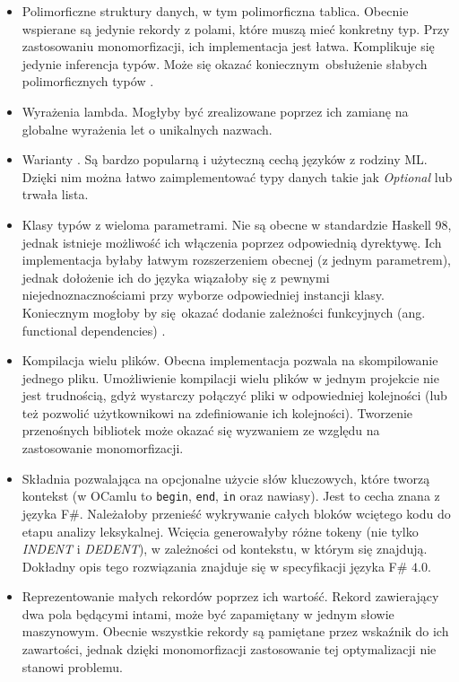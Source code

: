 \documentclass[declaration,shortabstract]{iithesis}
\begin{document}
\begin{itemize}
  \item Polimorficzne struktury danych, w tym polimorficzna tablica. Obecnie 
  wspierane są jedynie rekordy z polami, które muszą mieć konkretny typ. 
  Przy zastosowaniu monomorfizacji, ich implementacja jest łatwa. Komplikuje
  się jedynie inferencja typów. Może się okazać koniecznym obsłużenie słabych 
  polimorficznych typów \cite{weak_poly_ocaml}.
  \item Wyrażenia lambda. Mogłyby być zrealizowane poprzez ich zamianę na 
  globalne wyrażenia let o unikalnych nazwach. 
  \item Warianty \cite[Chapter 6]{real_ocaml}. Są bardzo popularną i użyteczną cechą 
  języków z rodziny ML. Dzięki nim można łatwo zaimplementować typy danych takie 
  jak \textit{Optional} lub trwała lista.   
  \item Klasy typów z wieloma parametrami. Nie są obecne w standardzie 
  Haskell 98, jednak istnieje możliwość ich włączenia poprzez odpowiednią 
  dyrektywę. Ich implementacja byłaby łatwym 
  rozszerzeniem obecnej (z jednym parametrem), jednak dołożenie ich do języka 
  wiązałoby się z pewnymi niejednoznacznościami \cite{multi_params_tcs}
  przy wyborze odpowiedniej instancji klasy. Koniecznym mogłoby by się okazać 
  dodanie zależności funkcyjnych (ang. functional dependencies) \cite{fun_deps}.
  \item Kompilacja wielu plików. Obecna implementacja pozwala na skompilowanie 
  jednego pliku. Umożliwienie kompilacji wielu plików w jednym projekcie nie 
  jest trudnością, gdyż wystarczy połączyć pliki w odpowiedniej kolejności
  (lub też pozwolić użytkownikowi na zdefiniowanie ich kolejności). Tworzenie 
  przenośnych bibliotek może okazać się wyzwaniem ze względu na zastosowanie 
  monomorfizacji.
  \item Składnia pozwalająca na opcjonalne użycie słów kluczowych, które tworzą 
  kontekst (w OCamlu to \texttt{begin}, \texttt{end}, \texttt{in} oraz nawiasy).
  Jest to cecha znana z języka F\#. Należałoby przenieść wykrywanie 
  całych bloków wciętego kodu do etapu analizy leksykalnej. Wcięcia generowałyby 
  różne tokeny (nie tylko \textit{INDENT} i \textit{DEDENT}), w zależności 
  od kontekstu, w którym się znajdują. Dokładny opis tego rozwiązania znajduje 
  się w specyfikacji języka F\# $4.0$\cite{fs_spec}.
  \item Reprezentowanie małych rekordów poprzez ich wartość. Rekord zawierający 
  dwa pola będącymi intami, może być zapamiętany w jednym słowie maszynowym. 
  Obecnie wszystkie rekordy są pamiętane przez wskaźnik do ich zawartości, 
  jednak dzięki monomorfizacji zastosowanie tej optymalizacji nie stanowi 
  problemu.

\end{itemize}
\end{document}

